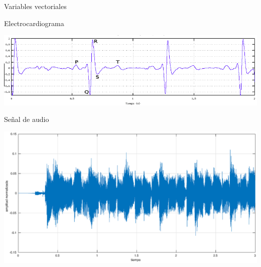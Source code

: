 \documentclass{bredelebeamer}
\begin{document}
\begin{frame}{Variables vectoriales}
\begin{center}
Electrocardiograma
\end{center}
\begin{center}
\includegraphics[scale=0.3]{images/img46.png}
\end{center}
\end{frame}

\begin{frame}
\centering Señal de audio
\begin{center}
\includegraphics[scale=0.3]{images/audio}
\end{center}
\end{frame}
\end{document}
